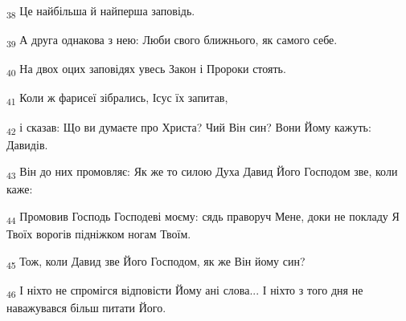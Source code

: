 \begin{tcolorbox}
\textsubscript{38} Це найбільша й найперша заповідь.
\end{tcolorbox}
\begin{tcolorbox}
\textsubscript{39} А друга однакова з нею: Люби свого ближнього, як самого себе.
\end{tcolorbox}
\begin{tcolorbox}
\textsubscript{40} На двох оцих заповідях увесь Закон і Пророки стоять.
\end{tcolorbox}
\begin{tcolorbox}
\textsubscript{41} Коли ж фарисеї зібрались, Ісус їх запитав,
\end{tcolorbox}
\begin{tcolorbox}
\textsubscript{42} і сказав: Що ви думаєте про Христа? Чий Він син? Вони Йому кажуть: Давидів.
\end{tcolorbox}
\begin{tcolorbox}
\textsubscript{43} Він до них промовляє: Як же то силою Духа Давид Його Господом зве, коли каже:
\end{tcolorbox}
\begin{tcolorbox}
\textsubscript{44} Промовив Господь Господеві моєму: сядь праворуч Мене, доки не покладу Я Твоїх ворогів підніжком ногам Твоїм.
\end{tcolorbox}
\begin{tcolorbox}
\textsubscript{45} Тож, коли Давид зве Його Господом, як же Він йому син?
\end{tcolorbox}
\begin{tcolorbox}
\textsubscript{46} І ніхто не спромігся відповісти Йому ані слова... І ніхто з того дня не наважувався більш питати Його.
\end{tcolorbox}
